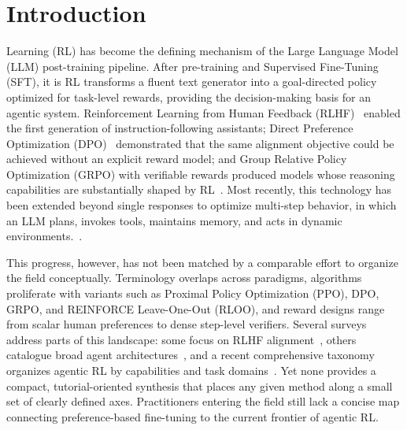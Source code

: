 \section{Introduction}\label{sec:introduction}

 Learning (RL) has become the defining
mechanism of the Large Language Model (LLM) post-training pipeline.
After pre-training and Supervised
Fine-Tuning (SFT), it is RL transforms a fluent text generator into a goal-directed policy optimized for task-level rewards, providing the decision-making basis for an agentic system. Reinforcement Learning from Human Feedback
(RLHF)~\cite{christiano2017deeprl} enabled the
first generation of instruction-following assistants; Direct Preference
Optimization (DPO)~\cite{rafailov2023dpo} demonstrated that the same
alignment objective could be achieved without an explicit reward model;
and Group Relative Policy Optimization (GRPO) with verifiable rewards
produced models whose reasoning capabilities are substantially shaped by
RL~\cite{shao2024deepseekmath}. Most recently, this technology has been extended beyond single responses to optimize multi-step behavior, in which an LLM plans, invokes tools, maintains memory, and acts in dynamic environments.~\cite{zhang2026landscape}.

This progress, however, has not been matched by a comparable effort to organize the field conceptually. Terminology
overlaps across paradigms, algorithms proliferate with variants such as
Proximal Policy Optimization (PPO), DPO, GRPO, and REINFORCE
Leave-One-Out (RLOO), and reward designs range from scalar human
preferences to dense step-level verifiers. Several surveys address parts
of this landscape: some focus on RLHF
alignment~\cite{kaufmann2024survey},
others catalogue broad agent
architectures~\cite{wang2024agentsurvey},
and a recent comprehensive taxonomy organizes agentic RL by capabilities
and task domains~\cite{zhang2026landscape}. Yet none provides a
compact, tutorial-oriented synthesis that places any given method
along a small set of clearly defined axes. Practitioners entering the
field still lack a concise map connecting preference-based fine-tuning to
the current frontier of agentic RL.

